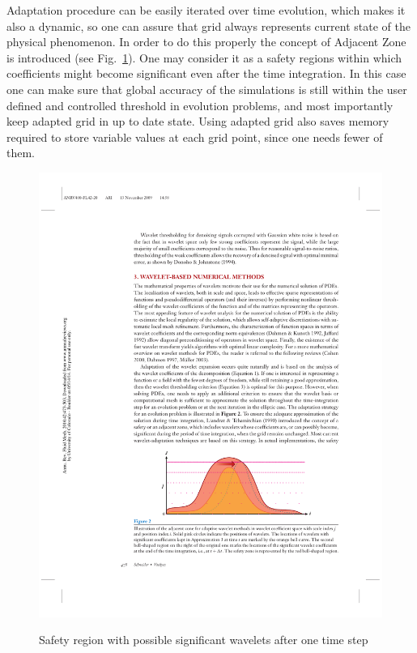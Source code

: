 Adaptation procedure can be easily iterated over time evolution, which makes it also a dynamic, so one can assure that grid always represents current state of the physical phenomenon. In order to do this properly the concept of Adjacent Zone is introduced \cite{lib:wlt_main} (see Fig.~\ref{fig:wlt_adj}). One may consider it as a safety regions within which coefficients might become significant even after the time integration. In this case one can make sure that global accuracy of the simulations is still within the user defined and controlled threshold in evolution problems, and most importantly keep adapted grid in up to date state. Using adapted grid also saves memory required to store variable values at each grid point, since one needs fewer of them.
\begin{figure}[h!]
\centering \includegraphics[scale=1]{fig/wlt_adj.pdf}\\
\caption{Safety region with possible significant wavelets after one time step \label{fig:wlt_adj}}
\end{figure}

